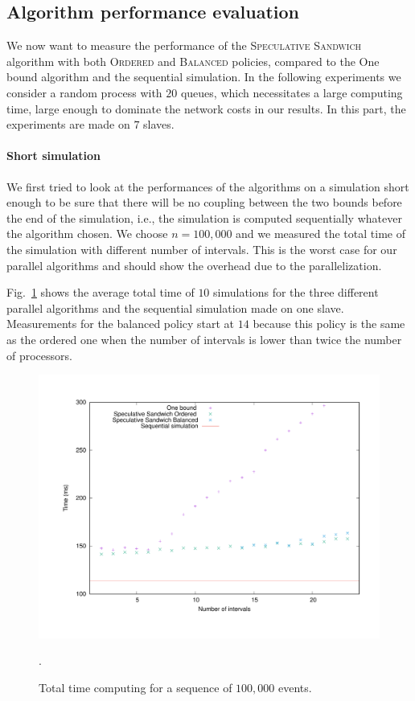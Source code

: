 \documentclass[a4paper,10pt]{article}
\begin{document}
\subsection{Algorithm performance evaluation}
We now want to measure the performance of the \textsc{Speculative Sandwich} algorithm with both \textsc{Ordered} and \textsc{Balanced} policies, compared to the One bound algorithm and the sequential simulation. In the following experiments we consider a random process with $20$ queues, which necessitates a large computing time, large enough to dominate the network costs in our results. In this part, the experiments are made on $7$ slaves.


\paragraph {Short simulation}
We first tried to look at the performances of the algorithms on a simulation short enough to be sure that there will be no coupling between the two bounds before the end of the simulation, i.e., the simulation is computed sequentially whatever the algorithm chosen. We choose $n = 100,000$ and we measured the total time of the simulation with different number of intervals. This is the worst case for our parallel algorithms and should show the overhead due to the parallelization.

Fig.~\ref{fig:short_time} shows the average total time of $10$ simulations for the three different parallel algorithms and the sequential simulation made on one slave. Measurements for the balanced policy start at $14$ because this policy is the same as the ordered one when the number of intervals is lower than twice the number of processors.
\begin{figure}[]
\centering
\label{fig:interslong}
 \includegraphics[scale=0.4]{time_short.pdf}
\caption{Total time computing for a sequence of $100,000$ events.}\label{fig:short_time}.
\end{figure}
\end{document}
